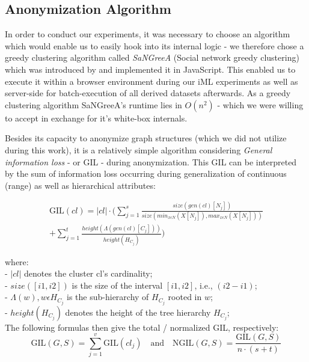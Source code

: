 \documentclass{llncs}
\providecommand{\abs}[1]{\lvert#1\rvert}
\begin{document}
\subsection{Anonymization Algorithm}
\label{ssect:algorithm}

In order to conduct our experiments, it was necessary to choose an algorithm which would enable us to easily hook into its internal logic - we therefore chose a greedy clustering algorithm called \textit{SaNGreeA} (Social network greedy clustering) which was introduced by \cite{campan2009data} and implemented it in JavaScript. This enabled us to execute it within a browser environment during our iML experiments as well as server-side for batch-execution of all derived datasets afterwards. As a greedy clustering algorithm SaNGreeA's runtime lies in $O(n^2)$ - which we were willing to accept in exchange for it's white-box internals.

Besides its capacity to anonymize graph structures (which we did not utilize during this work), it is a relatively simple algorithm considering \textit{General information loss} - or GIL - during anonymization. This GIL can be interpreted by the sum of information loss occurring during generalization of continuous (range) as well as hierarchical attributes:

\begin{equation*}
\begin{split}
\text{GIL}(cl) = \abs{cl} \cdot (\sum_{j=1}^{s} \frac{size(gen(cl)[N_j])}{size(min_{x \epsilon N} (X[N_j]), max_{x \epsilon N} (X[N_j]))} \\
+ \sum_{j=1}^{t} \frac{height(\Lambda(gen(cl)[C_j]))}{height(H_{C_j})})
\end{split}
\end{equation*}


where:\\
- $\abs{cl}$ denotes the cluster cl's cardinality; \\
- $size([i1,i2])$ is the size of the interval $[i1,i2]$, i.e., $(i2-i1)$; \\
- $\Lambda(w), w \epsilon H_{C_j}$ is the sub-hierarchy of $H_{C_j}$ rooted in $w$; \\
- $height(H_{C_j})$ denotes the height of the tree hierarchy $H_{C_j}$; \\


The following formulas then give the total / normalized GIL, respectively:
\begin{equation*}
\text{GIL}(G,S) = \sum_{j=1}^{v} \text{GIL}(cl_j) \quad \textrm{and} \quad
\text{NGIL}(G,S) = \frac{\text{GIL}(G,S)}{n \cdot (s+t)}
\end{equation*}
\end{document}
